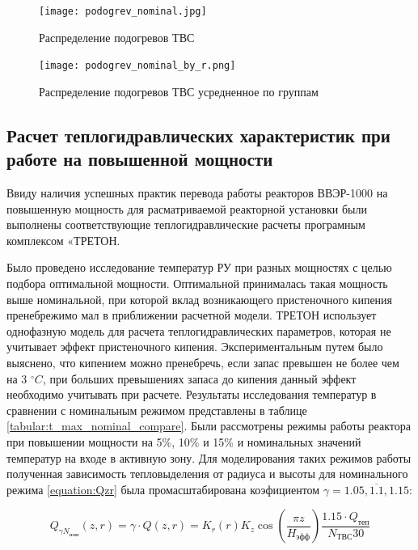 \begin{figure}[H]
	\begin{center}
		\texttt{[image: podogrev\_nominal.jpg]}
		\caption{Распределение подогревов ТВС}
		\label{pic:treton-podogrev-nominal} %
	\end{center}
\end{figure}

\begin{figure}[H]
	\begin{center}
		\texttt{[image: podogrev\_nominal\_by\_r.png]}
		\caption{Распределение подогревов ТВС усредненное по группам}
		\label{pic:treton-podogrev-nominal-by-r} %
	\end{center}
\end{figure}


\subsection{Расчет теплогидравлических характеристик при работе на повышенной мощности}
Ввиду наличия успешных практик перевода работы реакторов ВВЭР-1000 на повышенную мощность для расматриваемой реакторной установки были выполнены соответствующие теплогидравлические расчеты програмным комплексом «ТРЕТОН. 

Было проведено исследование температур РУ при разных мощностях с целью подбора оптимальной мощности. Оптимальной принималась такая мощность выше номинальной, при которой вклад возникающего пристеночного кипения пренебрежимо мал в приближении расчетной модели. ТРЕТОН использует однофазную модель для расчета теплогидравлических параметров, которая не учитывает эффект пристеночного кипения. Экспериментальным путем было выяснено, что кипением можно пренебречь, если запас превышен не более чем на 3 $^\circ C$, при больших превышениях запаса до кипения данный эффект необходимо учитывать при расчете. Результаты исследования температур в сравнении с номинальным режимом представлены в таблице \ref{tabular:t_max_nominal_compare}. Были рассмотрены режимы работы реактора при повышении мощности на 5\%, 10\% и 15\% и номинальных значений температур на входе в активную зону. Для моделирования таких режимов работы полученная зависимость тепловыделения от радиуса и высоты для номинального режима \ref{equation:Qzr} была промасштабирована коэфициентом $\gamma = \overline{1.05, 1.1, 1.15}$:


\begin{equation}
	Q_{ \gamma N_{\text{ном}}}(z,r) 
	= \gamma \cdot Q(z,r) 
	= K_r(r) K_z \cos \left( 
		\frac{\pi z}{H_{\text{эфф}}} 
	  \right) 
	  \frac{1.15 \cdot Q_{\text{теп}}}{N_{\text{ТВС}} 30}
\end{equation}

